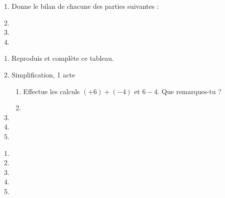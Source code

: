 \begin{activite}

\begin{enumerate}
\item Donne le bilan de chacune des parties suivantes :
\item
\item
\item
\end{enumerate}

\end{activite}


\begin{activite}

\begin{enumerate}
\item Reproduis et complète ce tableau.
\item Simplification, 1 acte
	\begin{enumerate}
	\item Effectue les calculs $(+6) + (-4)$ et $6-4$. Que remarques-tu ?
	\item
	\end{enumerate}
\item
\item
\item
\end{enumerate}

\end{activite}



\begin{activite}

\begin{enumerate}
\item
\item
\item
\item
\item
\end{enumerate}

\end{activite}